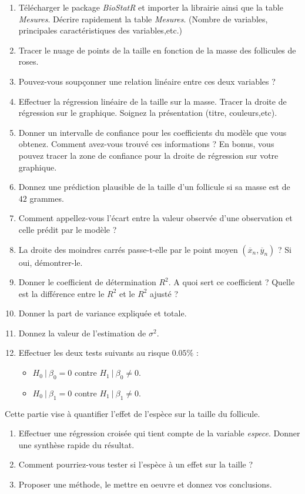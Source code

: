 \begin{enumerate}
\item Télécharger le package \textit{BioStatR} et importer la librairie ainsi que la table \textit{Mesures}. Décrire rapidement la table \textit{Mesures}. (Nombre de variables, principales caractéristiques des variables,etc.)
\item Tracer le nuage de points de la taille en fonction de la masse des follicules de roses.
\item Pouvez-vous soupçonner une relation linéaire entre ces deux variables ?
\item Effectuer la régression linéaire de la taille sur la masse. Tracer la droite de régression sur le graphique. Soignez la présentation (titre, couleurs,etc). 
\item Donner un intervalle de confiance pour les coefficients du modèle que vous obtenez. Comment avez-vous trouvé ces informations ? En bonus, vous pouvez tracer la zone de confiance pour la droite de régression sur votre graphique.
\item Donnez une prédiction plausible de la taille d'un follicule si sa masse est de $42$ grammes.
\item Comment appellez-vous l'écart entre la valeur observée d'une observation et celle prédit par le modèle ?
\item La droite des moindres carrés passe-t-elle par le point moyen $(\overline x_n, \overline y_n)$ ? Si oui, démontrer-le.
\item Donner le coefficient de détermination $R^2$. A quoi sert ce coefficient ? Quelle est la différence entre le $R^2$ et le $R^2$ ajusté ?
\item Donner la part de variance expliquée et totale.
\item Donnez la valeur de l'estimation de $\sigma^2$.
\item Effectuer les deux tests suivants au risque $0.05\%$ :
\begin{itemize}
\item $H_0 \ | \ \beta_0 = 0$ contre $H_1 \ | \ \beta_0 \neq 0$.
\item $H_0 \ | \ \beta_1 = 0$ contre $H_1 \ | \ \beta_1 \neq 0$.
\end{itemize}
\end{enumerate}

Cette partie vise à quantifier l'effet de l'espèce sur la taille du follicule. 

\begin{enumerate}
\item Effectuer une régression croisée qui tient compte de la variable \textit{espece}. Donner une synthèse rapide du résultat.
\item Comment pourriez-vous tester si l'espèce à un effet sur la taille ? 
\item Proposer une méthode, le mettre en oeuvre et donnez vos conclusions.
\end{enumerate}
